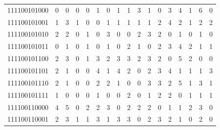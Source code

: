\documentclass[10pt,a4paper]{article}
\begin{document}
\begin{longtable}{ |c|c|c|c|c|c|c|c|c|c|c|c|c|c|c|c|c| }
    111100101000              & 0                            & 0                                & 0                            & 0                              & 1   & 0   & 1   & 1   & 3   & 1   & 0   & 3   & 4   & 1   & 6   & 0   \\
    111100101001              & 1                            & 3                                & 1                            & 0                              & 0   & 1   & 1   & 1   & 1   & 1   & 2   & 4   & 2   & 1   & 2   & 2   \\
    111100101010              & 2                            & 2                                & 0                            & 1                              & 0   & 3   & 0   & 0   & 2   & 3   & 2   & 0   & 1   & 0   & 1   & 0   \\
    111100101011              & 0                            & 1                                & 0                            & 1                              & 0   & 1   & 0   & 2   & 1   & 0   & 2   & 3   & 4   & 2   & 1   & 1   \\
    111100101100              & 2                            & 3                                & 0                            & 1                              & 3   & 2   & 3   & 3   & 2   & 3   & 2   & 0   & 5   & 2   & 0   & 0   \\
    111100101101              & 2                            & 1                                & 0                            & 0                              & 4   & 1   & 4   & 2   & 0   & 2   & 3   & 4   & 1   & 1   & 1   & 3   \\
    111100101110              & 2                            & 1                                & 0                            & 0                              & 2   & 2   & 1   & 0   & 0   & 3   & 3   & 2   & 5   & 1   & 3   & 1   \\
    111100101111              & 1                            & 0                                & 0                            & 0                              & 1   & 0   & 0   & 2   & 0   & 1   & 2   & 2   & 0   & 1   & 1   & 1   \\
    111100110000              & 4                            & 5                                & 0                            & 2                              & 2   & 3   & 0   & 2   & 2   & 2   & 0   & 1   & 1   & 2   & 3   & 0   \\
    111100110001              & 2                            & 3                                & 1                            & 1                              & 3   & 1   & 3   & 3   & 0   & 2   & 3   & 2   & 1   & 0   & 2   & 0   \\

\end{longtable}
\end{document}
